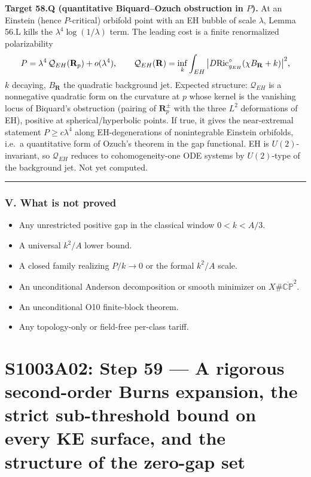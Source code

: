 \documentclass[
  10pt,
]{report}
\providecommand{\tightlist}{%
  \setlength{\itemsep}{0pt}\setlength{\parskip}{0pt}}
\begin{document}
\textbf{Target 58.Q (quantitative Biquard--Ozuch obstruction in \(P\)).}
At an Einstein (hence \(P\)-critical) orbifold point with an EH bubble
of scale \(\lambda\), Lemma 56.L kills the \(\lambda^4\log(1/\lambda)\)
term. The leading cost is a finite renormalized polarizability \[
P=\lambda^4\,\mathcal Q_{EH}(\mathbf R_p)+o(\lambda^4),\qquad
\mathcal Q_{EH}(\mathbf R)=\inf_{k}\int_{EH}\big|D{\rm Ric}^\circ_{g_{EH}}(\chi B_{\mathbf R}+k)\big|^2,
\] \(k\) decaying, \(B_{\mathbf R}\) the quadratic background jet.
Expected structure: \(\mathcal Q_{EH}\) is a nonnegative quadratic form
on the curvature at \(p\) whose kernel is the vanishing locus of
Biquard's obstruction (pairing of \(\mathbf R^\pm_p\) with the three
\(L^2\) deformations of EH), positive at spherical/hyperbolic points. If
true, it gives the near-extremal statement \(P\ge c\lambda^4\) along
EH-degenerations of nonintegrable Einstein orbifolds, i.e.~a
quantitative form of Ozuch's theorem in the gap functional. EH is
\(U(2)\)-invariant, so \(\mathcal Q_{EH}\) reduces to cohomogeneity-one
ODE systems by \(U(2)\)-type of the background jet. Not yet computed.

\begin{center}\rule{0.5\linewidth}{0.5pt}\end{center}

\hypertarget{v.-what-is-not-proved}{%
\subsection{V. What is not proved}\label{v.-what-is-not-proved}}

\begin{itemize}
\tightlist
\item
  Any unrestricted positive gap in the classical window \(0<k<A/3\).
\item
  A universal \(k^2/A\) lower bound.
\item
  A closed family realizing \(P/k\to0\) or the formal \(k^2/A\) scale.
\item
  An unconditional Anderson decomposition or smooth minimizer on
  \(X\#\overline{\mathbb{CP}}^2\).
\item
  An unconditional O10 finite-block theorem.
\item
  Any topology-only or field-free per-class tariff.
\end{itemize}

\hypertarget{s1003a02-step-59-a-rigorous-second-order-burns-expansion-the-strict-sub-threshold-bound-on-every-ke-surface-and-the-structure-of-the-zero-gap-set}{%
\chapter{S1003A02: Step 59 --- A rigorous second-order Burns expansion,
the strict sub-threshold bound on every KE surface, and the structure of
the zero-gap
set}\label{s1003a02-step-59-a-rigorous-second-order-burns-expansion-the-strict-sub-threshold-bound-on-every-ke-surface-and-the-structure-of-the-zero-gap-set}}
\end{document}
